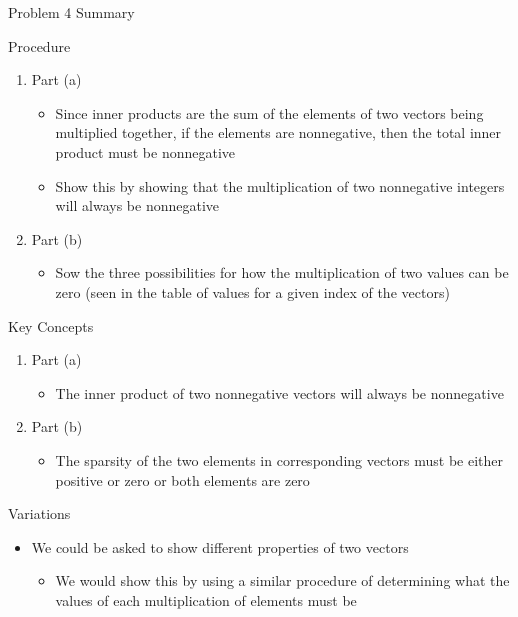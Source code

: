 \begin{summary}{Problem 4 Summary}
    \begin{statement}{Procedure}
        \begin{enumerate}[label = (\alph*)]
            \item Part (a)
            \begin{itemize}
                \item Since inner products are the sum of the elements of two vectors being multiplied together, if the elements are nonnegative, then the total inner product must be nonnegative
                \item Show this by showing that the multiplication of two nonnegative integers will always be nonnegative
            \end{itemize}
            \item Part (b)
            \begin{itemize}
                \item Sow the three possibilities for how the multiplication of two values can be zero (seen in the table of values for a given index of the vectors)
            \end{itemize}
        \end{enumerate}
    \end{statement}
    \begin{statement}{Key Concepts}
        \begin{enumerate}[label = (\alph*)]
            \item Part (a)
            \begin{itemize}
                \item The inner product of two nonnegative vectors will always be nonnegative
            \end{itemize}
            \item Part (b)
            \begin{itemize}
                \item The sparsity of the two elements in corresponding vectors must be either positive or zero or both elements are zero
            \end{itemize}
        \end{enumerate}
    \end{statement}
    \begin{statement}{Variations}
        \begin{itemize}
            \item We could be asked to show different properties of two vectors
            \begin{itemize}
                \item We would show this by using a similar procedure of determining what the values of each multiplication of elements must be
            \end{itemize}
        \end{itemize}
    \end{statement}
\end{summary}

